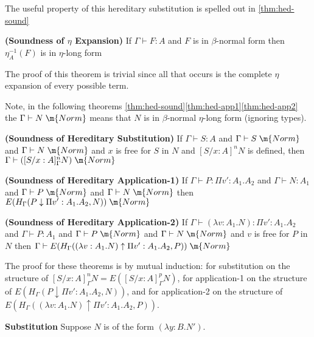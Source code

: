 The useful property of this hereditary substitution is spelled out in \ref{thm:hed-sound}

\begin{theorem}
\textbf{(Soundness of $\eta$ Expansion)}
If  $\Gamma \vdash F : A$ 
and $F$ is in $\beta$-normal form then
$\eta^{-1}_{A}(F)$ is in $\eta$-long form
\label{thm:hed-long}
\end{theorem}

The proof of this theorem is trivial since all that occurs is the complete $\eta$ expansion 
of every possible term. 

Note, in the following theorems \ref{thm:hed-sound}\ref{thm:hed-app1}\ref{thm:hed-app2} the $\Gamma \vdash N \; \m{Norm}$ means that $N $ is in $\beta$-normal 
$\eta$-long form (ignoring types).

\begin{theorem}
\textbf{(Soundness of Hereditary Substitution)}
If  $\Gamma \vdash S : A$ 
and $\Gamma \vdash S \; \m{Norm}$ 
and $\Gamma \vdash N \; \m{Norm}$ 
and $x$ is free for $S$ in $N$
and $[S / x : A]^n N$ is defined, 
then $\Gamma \vdash ([S / x : A]_\Gamma^n N) \; \m{Norm}$ 
\label{thm:hed-sound}
\end{theorem}
\begin{theorem}
\textbf{(Soundness of Hereditary Application-1)}
If  $\Gamma \vdash P : \Pi v' : A_1 . A_2$ 
and $\Gamma \vdash N : A_1$ 
and $\Gamma \vdash P \; \m{Norm}$ 
and $\Gamma \vdash N \; \m{Norm}$ 
then $E(H_\Gamma(P \downarrow \Pi v' : A_1 . A_2 , N)) \; \m{Norm}$ 
\label{thm:hed-app1}
\end{theorem}
\begin{theorem}
\textbf{(Soundness of Hereditary Application-2)}
If  $\Gamma \vdash (\lambda v : A_1 . N) : \Pi v' : A_1 . A_2$ 
and $\Gamma \vdash P : A_1$ 
and $\Gamma \vdash P \; \m{Norm}$ 
and $\Gamma \vdash N \; \m{Norm}$ 
and $v$ is free for $P$ in $N$
then $\Gamma \vdash E(H_\Gamma((\lambda v : A_1 . N) \uparrow \Pi v' : A_1 . A_2 , P)) \; \m{Norm}$ 
\label{thm:hed-app2}
\end{theorem}

The proof for these theorems is by mutual induction:  
for substitution on the structure of $[S/x : A]_\Gamma^n N = E([S/x : A]_\Gamma^p N)$, 
for application-1 on the structure of $E(H_\Gamma(P \downarrow \Pi v' : A_1 . A_2 , N))$,
and for application-2 on the structure of $E(H_\Gamma((\lambda v : A_1 . N) \uparrow \Pi v' : A_1 . A_2 , P))$.

\setcounter{tcases}{0}
\begin{tcases}
\textbf{Substitution} Suppose $N$ is of the form $(\lambda y : B . N')$.
\end{tcases}

